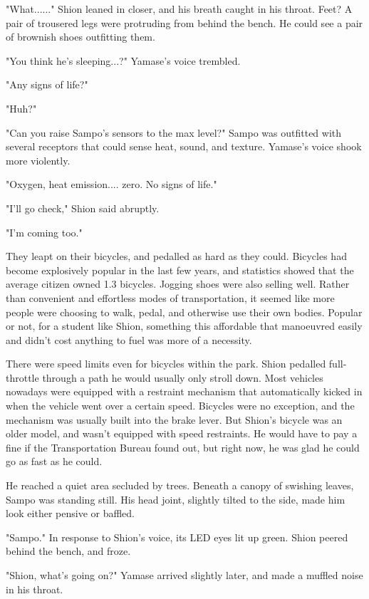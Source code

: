 "What......" Shion leaned in closer, and his breath caught in his
throat. Feet? A pair of trousered legs were protruding from behind the
bench. He could see a pair of brownish shoes outfitting them.

"You think he's sleeping...?" Yamase's voice trembled.

"Any signs of life?"

"Huh?"

"Can you raise Sampo's sensors to the max level?" Sampo was outfitted
with several receptors that could sense heat, sound, and texture.
Yamase's voice shook more violently.

"Oxygen, heat emission.... zero. No signs of life."

"I'll go check," Shion said abruptly.

"I'm coming too."

They leapt on their bicycles, and pedalled as hard as they could.
Bicycles had become explosively popular in the last few years, and
statistics showed that the average citizen owned 1.3 bicycles. Jogging
shoes were also selling well. Rather than convenient and effortless
modes of transportation, it seemed like more people were choosing to
walk, pedal, and otherwise use their own bodies. Popular or not, for a
student like Shion, something this affordable that manoeuvred easily and
didn't cost anything to fuel was more of a necessity.

There were speed limits even for bicycles within the park. Shion
pedalled full-throttle through a path he would usually only stroll down.
Most vehicles nowadays were equipped with a restraint mechanism that
automatically kicked in when the vehicle went over a certain speed.
Bicycles were no exception, and the mechanism was usually built into the
brake lever. But Shion's bicycle was an older model, and wasn't equipped
with speed restraints. He would have to pay a fine if the Transportation
Bureau found out, but right now, he was glad he could go as fast as he
could.

He reached a quiet area secluded by trees. Beneath a canopy of swishing
leaves, Sampo was standing still. His head joint, slightly tilted to the
side, made him look either pensive or baffled.

"Sampo." In response to Shion's voice, its LED eyes lit up green. Shion
peered behind the bench, and froze.

"Shion, what's going on?" Yamase arrived slightly later, and made a
muffled noise in his throat.

